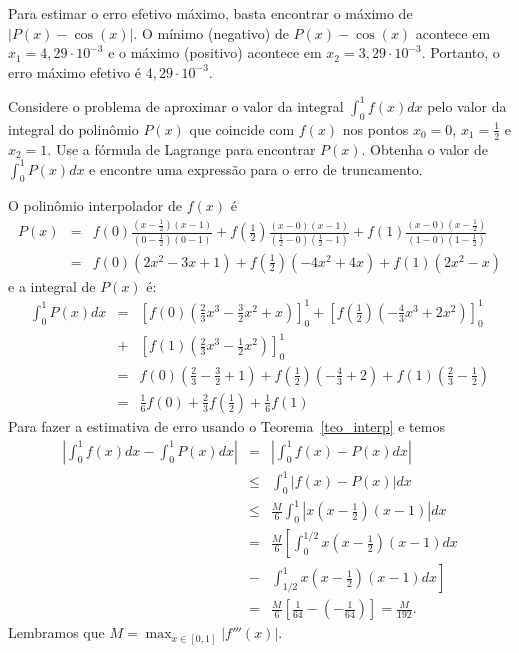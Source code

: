 \begin{sol}
Para estimar o erro efetivo máximo, basta encontrar o máximo de $|P(x)-\cos(x)|$. O mínimo (negativo) de $P(x)-\cos(x)$ acontece em $x_1=4,29\cdot 10^{-3}$ e o máximo (positivo) acontece em $x_2=3,29\cdot 10^{-3}$. Portanto, o erro máximo efetivo é $4,29\cdot 10^{-3}$.
\end{sol}


\begin{ex}\label{exemp_simpson}
Considere o problema de aproximar o valor da integral $\int_0^1 f(x)dx$ pelo valor da integral do polinômio $P(x)$ que coincide com $f(x)$ nos pontos $x_0=0$, $x_1=\frac{1}{2}$ e $x_2=1$. Use a fórmula de Lagrange para encontrar $P(x)$. Obtenha o valor de $\int_0^1P(x)dx$ e encontre uma expressão para o erro de truncamento.
\end{ex}
O polinômio interpolador de $f(x)$ é
\begin{eqnarray}
P(x)&=&f(0)\frac{(x-\frac{1}{2})(x-1)}{(0-\frac{1}{2})(0-1)}+f\left(\frac{1}{2}\right)\frac{(x-0)(x-1)}{(\frac{1}{2}-0)(\frac{1}{2}-1)}+f(1)\frac{(x-0)(x-\frac{1}{2})}{(1-0)(1-\frac{1}{2})}\\
&=&   f(0)(2x^2-3x+1)+f\left(\frac{1}{2}\right)(-4x^2+4x)+f(1)(2x^2-x)
\end{eqnarray}
e a integral de $P(x)$ é:
\begin{eqnarray}
\int_0^1 P(x)dx &=& \left[f(0)\left(\frac{2}{3}x^3 - \frac{3}{2}x^2+x\right)\right]_0^1 + \left[f\left(\frac{1}{2}\right)\left(-\frac{4}{3}x^3+2x^2\right)\right]_0^1 \\
&+& \left[f(1)\left(\frac{2}{3}x^3-\frac{1}{2}x^2\right)\right]_0^1\\
&=& f(0)\left(\frac{2}{3}-\frac{3}{2}+1\right)+f\left(\frac{1}{2}\right)\left(-\frac{4}{3}+2\right)+f(1)\left(\frac{2}{3}-\frac{1}{2}\right)\\
&=& \frac{1}{6}f(0)+\frac{2}{3}f\left(\frac{1}{2}\right)+\frac{1}{6}f(1)
\end{eqnarray}
Para fazer a estimativa de erro usando o Teorema~\ref{teo_interp} e temos
\begin{eqnarray}
\left|\int_0^1f(x)dx-\int_0^1 P(x)dx\right|&=&\left|\int_0^1f(x)- P(x)dx\right|\\
&\leq&\int_0^1|f(x)- P(x)|dx\\
&\leq& \frac{M}{6}  \int_0^1\left|x\left(x-\frac{1}{2}\right)(x-1)\right|dx\\
&=& \frac{M}{6}  \left[\int_0^{1/2}x\left(x-\frac{1}{2}\right)(x-1)dx\right.\\
&-&\left.\int_{1/2}^1x\left(x-\frac{1}{2}\right)(x-1)dx\right]\\
&=& \frac{M}{6}  \left[\frac{1}{64}-\left(-\frac{1}{64}\right)\right]=\frac{M}{192}.
\end{eqnarray}
Lembramos que $M=\max_{x\in[0,1]}|f'''(x)|$.

